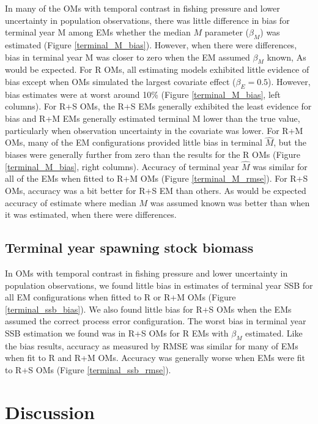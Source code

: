 \documentclass[
  12pt,
]{article}
\begin{document}
In many of the OMs with temporal contrast in fishing pressure and lower uncertainty in population observations, there was little difference in bias for terminal year M among EMs whether the median \(M\) parameter (\(\beta_M\)) was estimated (Figure \ref{terminal_M_bias}). However, when there were differences, bias in terminal year M was closer to zero when the EM assumed \(\beta_M\) known, As would be expected. For R OMs, all estimating models exhibited little evidence of bias except when OMs simulated the largest covariate effect (\(\beta_E = 0.5\)). However, bias estimates were at worst around 10\% (Figure \ref{terminal_M_bias}, left columns). For R+S OMs, the R+S EMs generally exhibited the least evidence for bias and R+M EMs generally estimated terminal M lower than the true value, particularly when observation uncertainty in the covariate was lower. For R+M OMs, many of the EM configurations provided little bias in terminal \(\widehat M\), but the biases were generally further from zero than the results for the R OMs (Figure \ref{terminal_M_bias}, right columns). Accuracy of terminal year \(\widehat M\) was similar for all of the EMs when fitted to R+M OMs (Figure \ref{terminal_M_rmse}). For R+S OMs, accuracy was a bit better for R+S EM than others. As would be expected accuracy of estimate where median \(M\) was assumed known was better than when it was estimated, when there were differences.

\hypertarget{terminal-year-spawning-stock-biomass}{%
\subsection*{Terminal year spawning stock biomass}\label{terminal-year-spawning-stock-biomass}}

In OMs with temporal contrast in fishing pressure and lower uncertainty in population observations, we found little bias in estimates of terminal year SSB for all EM configurations when fitted to R or R+M OMs (Figure \ref{terminal_ssb_bias}). We also found little bias for R+S OMs when the EMs assumed the correct process error configuration. The worst bias in terminal year SSB estimation we found was in R+S OMs for R EMs with \(\beta_M\) estimated. Like the bias results, accuracy as measured by RMSE was similar for many of EMs when fit to R and R+M OMs. Accuracy was generally worse when EMs were fit to R+S OMs (Figure \ref{terminal_ssb_rmse}).

\hypertarget{discussion}{%
\section*{Discussion}\label{discussion}}
\end{document}
